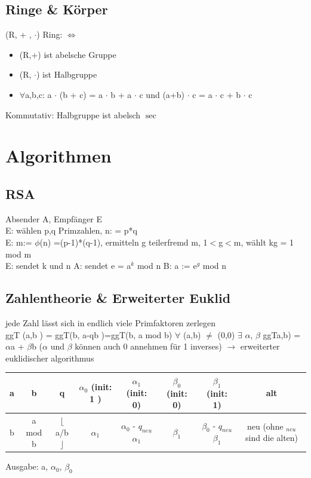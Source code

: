 \documentclass[]{article}
\begin{document}
\subsection{Ringe \& Körper}
(R, + , $\cdot$) Ring: $\Leftrightarrow$ 
\begin{itemize}
	 \item (R,+) ist abelsche Gruppe
	 \item (R, $\cdot$) ist Halbgruppe
	 \item $\forall$a,b,c: a $\cdot$ (b + c) = a $\cdot$ b + a $\cdot$ c und (a+b) $\cdot$ c = a $\cdot$ c + b $\cdot$ c 
\end{itemize}
Kommutativ: Halbgruppe ist abelsch
$\sec$
\section{Algorithmen}
\subsection{RSA}
Absender A, Empfänger E \\
E: wählen p,q Primzahlen, n: = p*q \\
E: m:= $\phi$(n) =(p-1)*(q-1), ermitteln g teilerfremd m, 1$<$g$<$m, wählt kg = 1 mod m \\
E: sendet k und n
A: sendet e = a$^k$ mod n
B: a := e$^g$ mod n 
\subsection{Zahlentheorie \& Erweiterter Euklid} 
jede Zahl lässt sich in endlich viele Primfaktoren zerlegen\\
ggT (a,b ) = ggT(b, a-qb )=ggT(b, a mod b) $\forall$ (a,b) $\neq$ (0,0)
$\exists$ $\alpha$, $\beta$ ggTa,b) = $\alpha$a + $\beta$b ($\alpha$ und $\beta$ können auch 0 annehmen für 1 inverses)
$\rightarrow$ erweiterter euklidischer algorithmus
\begin{tabular}{|c|c|c|c|c|c|c|c|}
	\hline
	a & b  &  q                                           &$\alpha_0$ (init: 1 ) &$\alpha_1$ (init: 0)  &$\beta_0$ (init: 0) &$\beta_1$ (init: 1) & alt   \\
	\hline                        
	b	& a mod b & $\lfloor$a/b$\rfloor$  & $\alpha_1$ &$\alpha_0$ - $q_{neu}$$\alpha_1$    & $\beta_1$ &$\beta_0$ - $q_{neu}$$\beta_1$  & neu (ohne $_{neu}$ sind die alten)\\
	\hline
\end{tabular}
Ausgabe: a, $\alpha_0$, $\beta_0$ \\
\newpage
\end{document}
